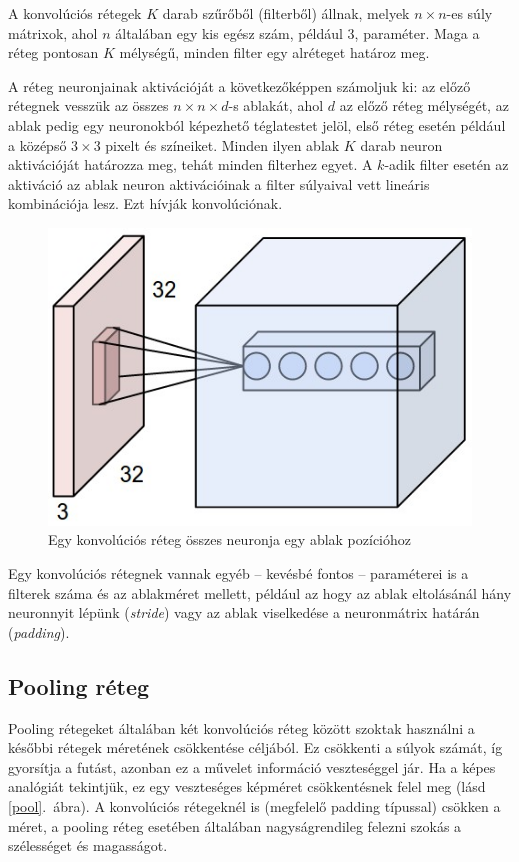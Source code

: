 A konvolúciós rétegek $K$ darab szűrőből (filterből) állnak, melyek $n\times n$-es súly mátrixok, ahol $n$ általában egy kis egész szám, például 3, paraméter. Maga a réteg pontosan $K$ mélységű, minden filter egy alréteget határoz meg.

A réteg neuronjainak aktivációját a következőképpen számoljuk ki: az előző rétegnek vesszük az összes $n\times n\times d$-s ablakát, ahol $d$ az előző réteg mélységét, az ablak pedig egy neuronokból képezhető téglatestet jelöl, első réteg esetén például a középső $3\times3$ pixelt és színeiket. Minden ilyen ablak $K$ darab neuron aktivációját határozza meg, tehát minden filterhez egyet. A $k$-adik filter esetén az aktiváció az ablak neuron aktivációinak a filter súlyaival vett lineáris kombinációja lesz. Ezt hívják konvolúciónak.

\begin{figure}[h!]
\begin{center}
  \includegraphics[width=0.4\linewidth]{depthcol.jpg}
  \caption{Egy konvolúciós réteg összes neuronja egy ablak pozícióhoz}
\end{center}
\end{figure}

Egy konvolúciós rétegnek vannak egyéb -- kevésbé fontos -- paraméterei is a filterek száma és az ablakméret mellett, például az hogy az ablak eltolásánál hány neuronnyit lépünk (\emph{stride}) vagy az ablak viselkedése a neuronmátrix határán (\emph{padding}).

\subsection{Pooling réteg}

Pooling rétegeket általában két konvolúciós réteg között szoktak használni a későbbi rétegek méretének csökkentése céljából. Ez csökkenti a súlyok számát, íg gyorsítja a futást, azonban ez a művelet információ veszteséggel jár. Ha a képes analógiát tekintjük, ez egy veszteséges képméret csökkentésnek felel meg (lásd \ref{pool}.~ábra). A konvolúciós rétegeknél is (megfelelő padding típussal) csökken a méret, a pooling réteg esetében általában nagyságrendileg felezni szokás a szélességet és magasságot.

